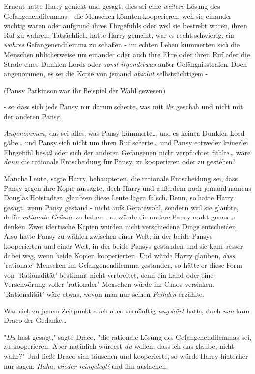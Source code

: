 {Erneut hatte Harry genickt und gesagt, dies sei eine \emph{weitere} Lösung des Gefangenendilemmas - die Menschen könnten kooperieren, weil sie einander wichtig waren oder aufgrund ihres Ehrgefühls oder weil sie bestrebt waren, ihren Ruf zu wahren. Tatsächlich, hatte Harry gemeint, war es recht schwierig, ein \emph{wahres} Gefangenendilemma zu schaffen - im echten Leben kümmerten sich die Menschen üblicherweise um einander oder auch ihre Ehre oder ihren Ruf oder die Strafe eines Dunklen Lords oder \emph{sonst irgendetwas} außer Gefängnisstrafen. Doch angenommen, es sei die Kopie von jemand \emph{absolut} selbstsüchtigem -

(Pansy Parkinson war ihr Beispiel der Wahl gewesen)

- so dass sich jede Pansy nur darum scherte, was mit \emph{ihr} geschah und nicht mit der anderen Pansy.

\emph{Angenommen,} das sei alles, was Pansy kümmerte… und es keinen Dunklen Lord gäbe… und Pansy sich nicht um ihren Ruf scherte… und Pansy entweder keinerlei Ehrgefühl besaß oder sich der anderen Gefangenen nicht verpflichtet fühlte… wäre \emph{dann} die rationale Entscheidung für Pansy, zu kooperieren oder zu gestehen?

Manche Leute, sagte Harry, behaupteten, die rationale Entscheidung sei, dass Pansy gegen ihre Kopie aussagte, doch Harry und außerdem noch jemand namens Douglas Hofstadter, glaubten diese Leute lägen falsch. Denn, so hatte Harry gesagt, wenn Pansy gestand - nicht aufs Geratewohl, sondern weil sie glaubte, dafür \emph{rationale Gründe} zu haben - so würde die andere Pansy exakt genauso denken. Zwei identische Kopien würden nicht verschiedene Dinge entscheiden. Also hatte Pansy zu wählen zwischen einer Welt, in der beide Pansys kooperierten und einer Welt, in der beide Pansys gestanden und sie kam besser dabei weg, wenn beide Kopien kooperierten. Und würde Harry glauben, \emph{dass} 'rationale' Menschen im Gefangenendilemma gestanden, so hätte er diese Form von 'Rationalität' bestimmt nicht verbreitet, denn ein Land oder eine Verschwörung voller 'rationaler' Menschen würde im Chaos versinken. 'Rationalität' wäre etwas, wovon man nur seinen \emph{Feinden} erzählte.

Was sich zu jenem Zeitpunkt auch alles vernünftig \emph{angehört} hatte, doch \emph{nun} kam Draco der Gedanke…

"\emph{Du} hast gesagt," sagte Draco, "die rationale Lösung des Gefangenendilemmas sei, zu kooperieren. Aber natürlich würdest \emph{du} wollen, dass ich das glaube, nicht wahr?" Und ließe Draco sich täuschen und kooperierte, so würde Harry hinterher nur sagen, \emph{Haha, wieder reingelegt!} und ihn auslachen.

}

